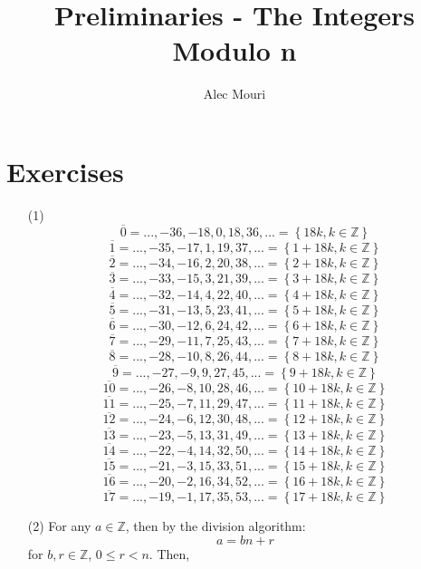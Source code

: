 \documentclass[12pt]{article}
\begin{document}
\title{Preliminaries - The Integers Modulo n}
\author{Alec Mouri}

\maketitle
\section*{Exercises}
\begin{itemize}
\item[(1)]
$$\overline{0} = ..., -36, -18, 0, 18, 36, ... = \left\lbrace 18k, k \in \mathbb{Z}\right\rbrace$$
$$\overline{1} = ..., -35, -17, 1, 19, 37, ... = \left\lbrace 1 + 18k, k \in \mathbb{Z}\right\rbrace$$
$$\overline{2} = ..., -34, -16, 2, 20, 38, ... = \left\lbrace 2 + 18k, k \in \mathbb{Z}\right\rbrace$$
$$\overline{3} = ..., -33, -15, 3, 21, 39, ... = \left\lbrace 3 + 18k, k \in \mathbb{Z}\right\rbrace$$
$$\overline{4} = ..., -32, -14, 4, 22, 40, ... = \left\lbrace 4 + 18k, k \in \mathbb{Z}\right\rbrace$$
$$\overline{5} = ..., -31, -13, 5, 23, 41, ... = \left\lbrace 5 + 18k, k \in \mathbb{Z}\right\rbrace$$
$$\overline{6} = ..., -30, -12, 6, 24, 42, ... = \left\lbrace 6 + 18k, k \in \mathbb{Z}\right\rbrace$$
$$\overline{7} = ..., -29, -11, 7, 25, 43, ... = \left\lbrace 7 + 18k, k \in \mathbb{Z}\right\rbrace$$
$$\overline{8} = ..., -28, -10, 8, 26, 44, ... = \left\lbrace 8 + 18k, k \in \mathbb{Z}\right\rbrace$$
$$\overline{9} = ..., -27, -9, 9, 27, 45, ... = \left\lbrace 9 + 18k, k \in \mathbb{Z}\right\rbrace$$
$$\overline{10} = ..., -26, -8, 10, 28, 46, ... = \left\lbrace 10 + 18k, k \in \mathbb{Z}\right\rbrace$$
$$\overline{11} = ..., -25, -7, 11, 29, 47, ... = \left\lbrace 11 + 18k, k \in \mathbb{Z}\right\rbrace$$
$$\overline{12} = ..., -24, -6, 12, 30, 48, ... = \left\lbrace 12 + 18k, k \in \mathbb{Z}\right\rbrace$$
$$\overline{13} = ..., -23, -5, 13, 31, 49, ... = \left\lbrace 13 + 18k, k \in \mathbb{Z}\right\rbrace$$
$$\overline{14} = ..., -22, -4, 14, 32, 50, ... = \left\lbrace 14 + 18k, k \in \mathbb{Z}\right\rbrace$$
$$\overline{15} = ..., -21, -3, 15, 33, 51, ... = \left\lbrace 15 + 18k, k \in \mathbb{Z}\right\rbrace$$
$$\overline{16} = ..., -20, -2, 16, 34, 52, ... = \left\lbrace 16 + 18k, k \in \mathbb{Z}\right\rbrace$$
$$\overline{17} = ..., -19, -1, 17, 35, 53, ... = \left\lbrace 17 + 18k, k \in \mathbb{Z}\right\rbrace$$
\item[(2)] For any $a \in \mathbb{Z}$, then by the division algorithm:
$$a = bn + r$$
for $b, r \in \mathbb{Z}$, $0 \leq r < n$. Then,

\end{itemize}
\end{document}
